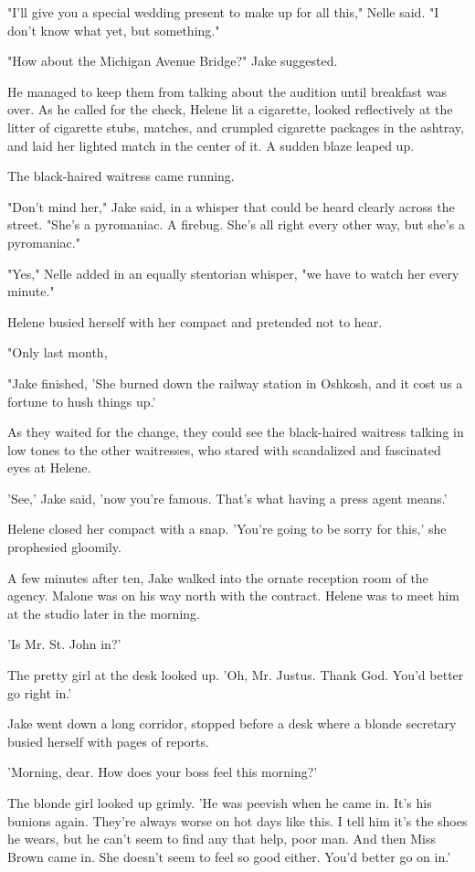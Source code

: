 \documentclass{novel}
\begin{document}
"I'll give you a special wedding present to make up for all this," Nelle said. "I don't know what yet, but something."

"How about the Michigan Avenue Bridge?" Jake suggested.

He managed to keep them from talking about the audition until breakfast was over. As he called for the check, Helene lit a cigarette, looked reflectively at the litter of cigarette stubs, matches, and crumpled cigarette packages in the ashtray, and laid her lighted match in the center of it. A sudden blaze leaped up.

The black-haired waitress came running.

"Don't mind her," Jake said, in a whisper that could be heard clearly across the street. "She's a pyromaniac. A firebug. She's all right every other way, but she's a pyromaniac."

"Yes," Nelle added in an equally stentorian whisper, "we have to watch her every minute."

Helene busied herself with her compact and pretended not to hear.

"Only last month,

"Jake finished, 'She burned down the railway station in Oshkosh, and it cost us a fortune to hush things up.'

As they waited for the change, they could see the black-haired waitress talking in low tones to the other waitresses, who stared with scandalized and fascinated eyes at Helene.

'See,' Jake said, 'now you’re famous. That’s what having a press agent means.'

Helene closed her compact with a snap. 'You’re going to be sorry for this,' she prophesied gloomily.

A few minutes after ten, Jake walked into the ornate reception room of the agency. Malone was on his way north with the contract. Helene was to meet him at the studio later in the morning.

'Is Mr. St. John in?'

The pretty girl at the desk looked up. 'Oh, Mr. Justus. Thank God. You’d better go right in.'

Jake went down a long corridor, stopped before a desk where a blonde secretary busied herself with pages of reports.

'Morning, dear. How does your boss feel this morning?'

The blonde girl looked up grimly. 'He was peevish when he came in. It’s his bunions again. They’re always worse on hot days like this. I tell him it’s the shoes he wears, but he can’t seem to find any that help, poor man. And then Miss Brown came in. She doesn’t seem to feel so good either. You’d better go on in.'
\end{document}
